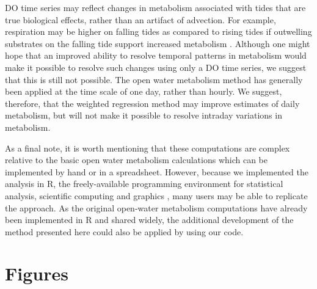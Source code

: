 \documentclass[letterpaper,12pt,oneside]{article}\usepackage[]{graphicx}\usepackage[]{color}
\begin{document}
\ac{DO} time series may reflect changes in metabolism associated with tides that are true biological effects, rather than an artifact of advection.  For example, respiration may be higher on falling tides as compared to rising tides if outwelling substrates on the falling tide support increased metabolism \citep{Sasaki09}.  Although one might hope that an improved ability to resolve temporal patterns in metabolism would make it possible to resolve such changes using only a \ac{DO} time series, we suggest that this is still not possible.  The open water metabolism method has generally been applied at the time scale of one day, rather than hourly.  We suggest, therefore, that the weighted regression method may improve estimates of daily metabolism, but will not make it possible to resolve intraday variations in metabolism.   

As a final note, it is worth mentioning that these computations are complex relative to the basic open water metabolism calculations which can be implemented by hand or in a spreadsheet.  However, because we implemented the analysis in R, the freely-available programming environment for statistical analysis, scientific computing and graphics , many users may be able to replicate the approach.  As the original open-water metabolism computations have already been implemented in R and shared widely, the additional development of the method presented here could also be applied by using our code.

\clearpage
\begin{singlespace}


\end{singlespace}
\clearpage


\section{Figures}
\end{document}
